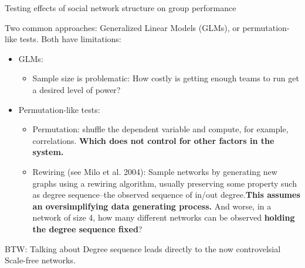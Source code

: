 \documentclass[10pt,ignorenonframetext,aspectratio=169,]{beamer}
\providecommand{\tightlist}{%
  \setlength{\itemsep}{0pt}\setlength{\parskip}{0pt}}
\begin{document}
\begin{frame}{Testing effects of social network structure on group
performance}
\protect\hypertarget{testing-effects-of-social-network-structure-on-group-performance}{}

Two common approaches: Generalized Linear Models (GLMs), or
permutation-like tests. Both have limitations:\pause

\begin{itemize}
\item
  GLMs:\pause

  \begin{itemize}
  \tightlist
  \item
    Sample size is problematic: How costly is getting enough teams to
    run get a desired level of power?\pause
  \end{itemize}
\item
  Permutation-like tests:\pause

  \begin{itemize}
  \item
    Permutation: shuffle the dependent variable and compute, for
    example, correlations.\pause{}
    \textcolor{USCCardinal}{\textbf{Which does not control for other factors in the system.}}\pause
  \item
    Rewiring (see Milo et al. 2004): Sample networks by generating new
    graphs using a rewiring algorithm, usually preserving some property
    such as degree sequence--the observed sequence of in/out
    degree.\pause \textcolor{USCCardinal}{\textbf{This assumes an oversimplifying data generating process.}}\pause{}
    And worse, in a network of size 4, how many different networks can
    be observed \textbf{holding the degree sequence fixed}?
  \end{itemize}
\end{itemize}

\pause BTW: Talking about Degree sequence leads directly to the now
controvelsial Scale-free networks.

\end{frame}
\end{document}
